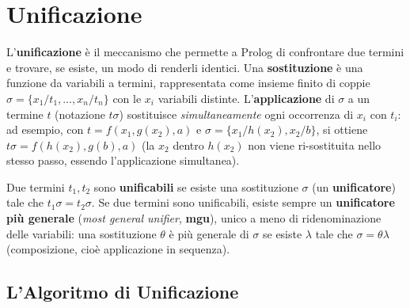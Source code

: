 \documentclass[a4paper,11pt]{article}
\begin{document}
\newpage
\section{Unificazione}

L'\textbf{unificazione} è il meccanismo che permette a Prolog di confrontare due termini e trovare, se esiste, un modo di renderli identici. Una \textbf{sostituzione} è una funzione da variabili a termini, rappresentata come insieme finito di coppie $\sigma=\{x_1/t_1,\ldots,x_n/t_n\}$ con le $x_i$ variabili distinte. L'\textbf{applicazione} di $\sigma$ a un termine $t$ (notazione $t\sigma$) sostituisce \emph{simultaneamente} ogni occorrenza di $x_i$ con $t_i$: ad esempio, con $t=f(x_1,g(x_2),a)$ e $\sigma=\{x_1/h(x_2),x_2/b\}$, si ottiene $t\sigma=f(h(x_2),g(b),a)$ (la $x_2$ dentro $h(x_2)$ non viene ri-sostituita nello stesso passo, essendo l'applicazione simultanea).

Due termini $t_1,t_2$ sono \textbf{unificabili} se esiste una sostituzione $\sigma$ (un \textbf{unificatore}) tale che $t_1\sigma=t_2\sigma$. Se due termini sono unificabili, esiste sempre un \textbf{unificatore più generale} (\emph{most general unifier}, \textbf{mgu}), unico a meno di ridenominazione delle variabili: una sostituzione $\theta$ è più generale di $\sigma$ se esiste $\lambda$ tale che $\sigma=\theta\lambda$ (composizione, cioè applicazione in sequenza).

\subsection{L'Algoritmo di Unificazione}
\end{document}
